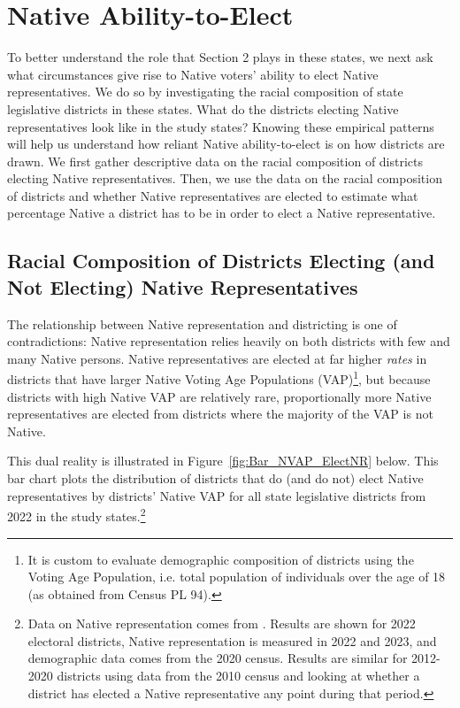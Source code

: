 \documentclass[12pt]{article}
\begin{document}
\section{Native Ability-to-Elect}

To better understand the role that Section 2 plays in these states, we next ask what circumstances give rise to Native voters' ability to elect Native representatives.  We do so by investigating the racial composition of state legislative districts in these states.  What do the districts electing Native representatives look like in the study states?  Knowing these empirical patterns will help us understand how reliant Native ability-to-elect is on how districts are drawn.  We first gather descriptive data on the racial composition of districts electing Native representatives.  Then, we use the data on the racial composition of districts and whether Native representatives are elected to estimate what percentage Native a district has to be in order to elect a Native representative.

\subsection{Racial Composition of Districts Electing (and Not Electing) Native Representatives}

The relationship between Native representation and districting is one of contradictions: Native representation relies heavily on both districts with few and many Native persons.  Native representatives are elected at far higher \emph{rates} in districts that have larger Native Voting Age Populations (VAP)\footnote{It is custom to evaluate demographic composition of districts using the Voting Age Population, i.e. total population of individuals over the age of 18 (as obtained from Census PL 94).}, but because districts with high Native VAP are relatively rare, proportionally more Native representatives are elected from districts where the majority of the VAP is not Native. 

This dual reality is illustrated in Figure~\ref{fig:Bar_NVAP_ElectNR} below. This bar chart plots the distribution of districts that do (and do not) elect Native representatives by districts' Native VAP for all state legislative districts from 2022 in the study states.\footnote{Data on Native representation comes from \cite{blasingame2025are}. Results are shown for 2022 electoral districts, Native representation is measured in 2022 and 2023, and demographic data comes from the 2020 census. Results are similar for 2012-2020 districts using data from the 2010 census and looking at whether a district has elected a Native representative any point during that period.}
\end{document}
